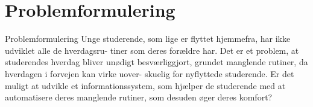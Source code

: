 \section{Problemformulering}
\begin{frame}{Problemformulering}{}
Unge studerende, som lige er ﬂyttet hjemmefra, har ikke udviklet alle de hverdagsru-
tiner som deres forældre har. Det er et problem, at studerendes hverdag bliver unødigt
besværliggjort, grundet manglende rutiner, da hverdagen i forvejen kan virke uover-
skuelig for nyﬂyttede studerende. Er det muligt at udvikle et informationssystem, som
hjælper de studerende med at automatisere deres manglende rutiner, som desuden
øger deres komfort?
\end{frame}